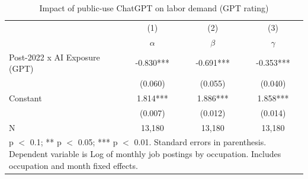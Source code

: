 \begin{table}[h]\centering
\def\sym#1{\ifmmode^{#1}\else\(^{#1}\)\fi}
\caption{Impact of public-use ChatGPT on labor demand (GPT rating) \label{tab:did_postings_gpt}}
\begin{tabular}{l*{3}{c}}
\hline\hline
                    &\multicolumn{1}{c}{(1)}&\multicolumn{1}{c}{(2)}&\multicolumn{1}{c}{(3)}\\
                    &\multicolumn{1}{c}{$\alpha$}&\multicolumn{1}{c}{$\beta$}&\multicolumn{1}{c}{$\gamma$}\\
\hline
Post-2022 x AI Exposure (GPT)&      -0.830***&      -0.691***&      -0.353***\\
                    &     (0.060)   &     (0.055)   &     (0.040)   \\
Constant            &       1.814***&       1.886***&       1.858***\\
                    &     (0.007)   &     (0.012)   &     (0.014)   \\
\hline
N                   &      13,180   &      13,180   &      13,180   \\
\hline\hline
\multicolumn{4}{p{0.7\linewidth}}{\footnotesize * p $<$ 0.1; ** p $<$ 0.05; *** p $<$ 0.01. Standard errors in parenthesis.          Dependent variable is Log of monthly job postings by occupation. Includes occupation and month fixed effects.}\\
\end{tabular}
\end{table}
